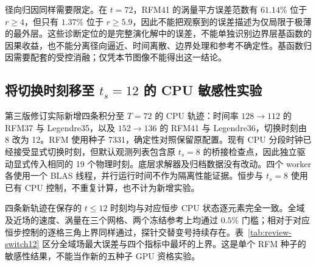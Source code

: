 径向归因同样需要限定。在 $t=72$，RFM41 的涡量平方误差范数有 $61.14\%$ 位于 $r\ge4$，但只有 $1.37\%$ 位于 $r\ge5.9$，因此不能把观察到的误差描述为仅局限于极薄的最外层。这些诊断定位的是完整演化解中的误差，不能单独识别边界层基函数的因果收益，也不能分离径向逼近、时间离散、边界处理和参考不确定性。基函数归因需要配套的受控消融；仅凭本节图像不能得出这一结论。

\subsection{将切换时刻移至 $t_s=12$ 的 CPU 敏感性实验}
\label{sec:review-switch}

第三版修订实际新增四条积分至 $T=72$ 的 CPU 轨迹：时间率 $128\to112$ 的 RFM37 与 Legendre35，以及 $152\to136$ 的 RFM41 与 Legendre36，切换时刻由 8 改为 12。RFM 使用种子 7331，确定性对照保留原配置。现有 CPU 分段时钟已经接受显式切换时刻，但默认观测列表包含原 $t_s=8$ 的桥接检查点，因此独立驱动显式传入相同的 19 个物理时刻。底层求解器及归档数据没有改动。四个 worker 各使用一个 BLAS 线程，并行运行时间不作为隔离性能证据。恒步与 $t_s=8$ 使用已有 CPU 控制，不重复计算，也不计为新增实验。

四条新轨迹在保存的 $t\le12$ 时刻均与对应恒步 CPU 状态逐元素完全一致。全域及近场的速度、涡量在三个网格、两个冻结参考上均通过 $0.5\%$ 门槛；相对于对应恒步控制的逐格三角上界同样通过，探针交替变号持续存在。表~\ref{tab:review-switch12} 区分全域场最大误差与四个指标中最坏的上界。这是单个 RFM 种子的敏感性结果，不能当作新的五种子 GPU 资格实验。

